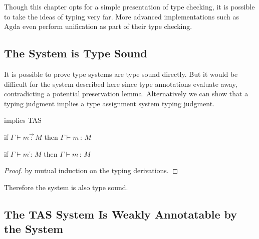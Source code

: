 
Though this chapter opts for a simple presentation of \bidir{} type checking, it is possible to take the ideas of \bidir{} typing very far.
More advanced \bidir{} implementations such as Agda\cite{norell2007towards} even perform unification as part of their \bidir{} type checking.

\subsection{The \Bidir{} System is Type Sound}
 
It is possible to prove \bidir{} type systems are type sound directly\cite{nanevski2005dependent}.
But it would be difficult for the system described here since type annotations evaluate away, contradicting a potential preservation lemma.
Alternatively we can show that a \bidir{} typing judgment implies a type assignment system typing judgment.
 
\begin{thm}
\Bidir{} implies \ac{TAS}
 
if $\Gamma\vdash m\overrightarrow{\,:\,}M$ then $\Gamma\vdash m\,:\,M$
 
if $\Gamma\vdash m\overleftarrow{\,:\,}M$ then $\Gamma\vdash m\,:\,M$
\end{thm}
 
\begin{proof}
by mutual induction on the \bidir{} typing derivations.
\end{proof}
Therefore the \bidir{} system is also type sound.
 
\subsection{The \ac{TAS} System Is Weakly Annotatable by the \Bidir{} System}
 
